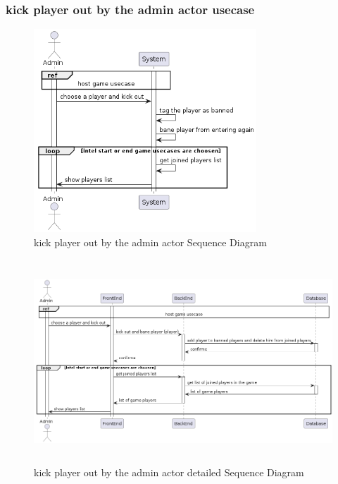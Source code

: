 \documentclass{article}
\begin{document}
\subsubsection{kick player out by the admin actor usecase}
 \begin{figure}[H]
	 \centering
	 \includegraphics[height=3in]{../thesis_tex/assets/diagrams/kick_player_out_SD.png}
	 \caption{kick player out by the admin actor Sequence Diagram}
\end{figure}

 \begin{figure}[H]
	 \centering
	 \includegraphics[height=3in,width=6in]{../thesis_tex/assets/diagrams/kick_player_out_detailedSD.png}
	 \caption{kick player out by the admin actor detailed Sequence Diagram}
\end{figure}
\end{document}
